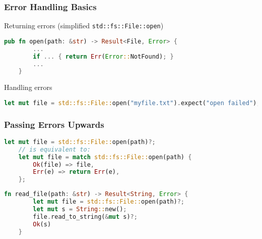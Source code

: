 \begin{frame}[fragile]
    \frametitle{Error Handling Basics}

    \begin{exampleblock}{Returning errors (simplified \texttt{std::fs::File::open})}
    \begin{lstlisting}[language=rust]
    pub fn open(path: &str) -> Result<File, Error> {
        ...
        if ... { return Err(Error::NotFound); }
        ...
    }
    \end{lstlisting}
    \end{exampleblock}

    \pause

    \begin{exampleblock}{Handling errors}
    \begin{lstlisting}[language=rust]
    let mut file = std::fs::File::open("myfile.txt").expect("open failed");
    \end{lstlisting}
    \end{exampleblock}
\end{frame}

\begin{frame}[fragile]
    \frametitle{Passing Errors Upwards}

    \begin{lstlisting}[language=rust]
    let mut file = std::fs::File::open(path)?;
    // is equivalent to:
    let mut file = match std::fs::File::open(path) {
        Ok(file) => file,
        Err(e) => return Err(e),
    };
    \end{lstlisting}

    \pause

    \begin{lstlisting}[language=rust]
    fn read_file(path: &str) -> Result<String, Error> {
        let mut file = std::fs::File::open(path)?;
        let mut s = String::new();
        file.read_to_string(&mut s)?;
        Ok(s)
    }
    \end{lstlisting}
\end{frame}


